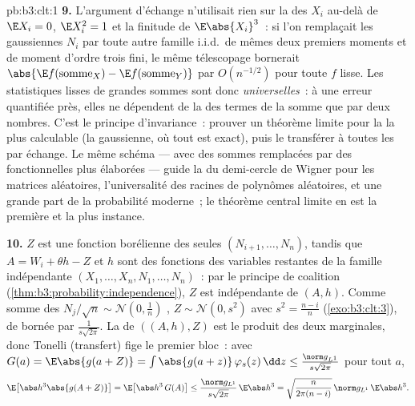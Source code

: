 \begin{solution}{pb:b3:clt:1}
\textbf{9.} L'argument d'échange n'utilisait rien sur la 
des $X_i$ au-delà de $\E X_i = 0$, $\E X_i^2 = 1$ et la
finitude de $\E\abs{X_i}^3$~: si l'on remplaçait les
gaussiennes $N_i$ par toute autre famille i.i.d.\ de mêmes
deux premiers moments et de moment d'ordre trois fini, le
même télescopage bornerait $\abs{\E f(\mathrm{somme}_X) - \E
f(\mathrm{somme}_Y)}$ par $O(n^{-1/2})$ pour toute $f$ lisse.
Les statistiques lisses de grandes sommes  sont
donc \emph{universelles}~: à une erreur quantifiée près,
elles ne dépendent de la  des termes de la somme que par deux
nombres. C'est le principe d'invariance~: prouver un théorème
limite pour la  la plus calculable (la gaussienne, où tout
est exact), puis le transférer à toutes les  par échange.
Le même schéma --- avec des sommes remplacées par des
fonctionnelles plus élaborées --- guide la  du
demi-cercle de Wigner pour les matrices aléatoires,
l'universalité des racines de polynômes aléatoires, et une
grande part de la probabilité moderne~; le théorème central
limite en est la première et la plus  instance.

\textbf{10.} $Z$ est une fonction borélienne des seules
$(N_{i+1}, \dots, N_n)$, tandis que $A = W_i + \theta h - Z$
et $h$ sont des fonctions des variables restantes de la
famille indépendante $(X_1, \dots, X_n, N_1, \dots, N_n)$~:
par le principe de coalition
(\cref{thm:b3:probability:independence}), $Z$ est
indépendante de $(A, h)$. Comme somme des $N_j/\sqrt n \sim
\mathcal N(0, \frac1n)$ , $Z \sim \mathcal
N(0, s^2)$ avec $s^2 = \frac{n-i}n$ (\cref{exo:b3:clt:3}),
de  bornée par $\frac1{s\sqrt{2\pi}}$. La  de
$((A, h), Z)$ est le produit des deux  marginales, donc
Tonelli (transfert) fige le premier bloc~: avec $G(a) =
\E\abs{g(a + Z)} = \int\abs{g(a + z)}\,\varphi_s(z)\,\dd z
\leq \frac{\norm g_{L^1}}{s\sqrt{2\pi}}$ pour tout $a$,
\[
\E\bigl[\abs h^3\abs{g(A + Z)}\bigr] =
\E\bigl[\abs h^3\,G(A)\bigr] \leq
\frac{\norm g_{L^1}}{s\sqrt{2\pi}}\,\E\abs h^3
= \sqrt{\frac{n}{2\pi(n-i)}}\,\norm g_{L^1}\,\E\abs h^3 .
\]


\end{solution}
